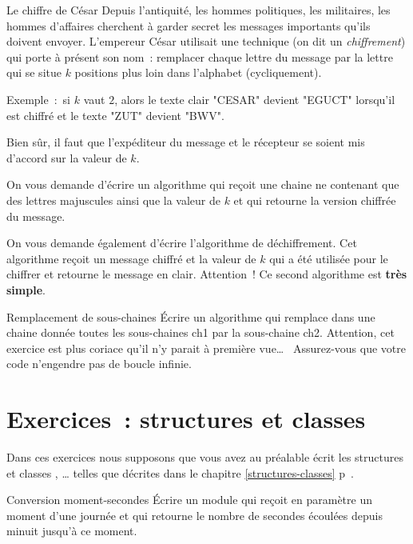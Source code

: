 \begin{Exercice}{Le chiffre de César}
	\label{ex:cesar}
	Depuis l’antiquité, les hommes politiques, les militaires, 
	les hommes d’affaires cherchent à garder secret les messages
	importants qu’ils doivent envoyer.
	L’empereur César utilisait une technique (on dit un \emph{chiffrement})
	qui porte à présent son nom~:
	remplacer chaque lettre du message par la lettre qui se situe 
	$k$ positions plus loin dans l’alphabet (cycliquement).

	Exemple~:~si $k$ vaut $2$, 
	alors le texte clair "CESAR" devient "EGUCT" lorsqu’il est chiffré 
	et le texte "ZUT" devient "BWV".

	Bien sûr, il faut que l’expéditeur du message et le récepteur
	se soient mis d’accord sur la valeur de $k$.

	On vous demande d’écrire un algorithme qui reçoit une chaine ne contenant
	que des lettres majuscules ainsi que la valeur de $k$ et qui retourne
	la version chiffrée du message.

	On vous demande également d’écrire l’algorithme de déchiffrement.
	Cet algorithme reçoit un message chiffré et la valeur de $k$ qui a été
	utilisée pour le chiffrer et retourne le message en clair.
	Attention~! Ce second algorithme est \textbf{très simple}.
\end{Exercice}

\begin{Exercice}{Remplacement de sous-chaines}
	Écrire un algorithme 
	qui remplace dans une chaine donnée 
	toutes les sous-chaines ch1 par la sous-chaine ch2. 
	Attention, 
	cet exercice est plus coriace qu’il n’y parait à première vue\dots~
	Assurez-vous que votre code n’engendre pas de boucle infinie. 
\end{Exercice}	










\section{Exercices~: structures et classes}

Dans ces exercices nous supposons que vous avez au préalable écrit les
structures et classes , … telles que décrites dans le
chapitre \ref{structures-classes} p~\pageref{structures-classes}.

\begin{Exercice}{Conversion moment-secondes}
	Écrire un module qui reçoit en paramètre un
	moment d’une journée et qui retourne le nombre de secondes écoulées
	depuis minuit jusqu’à ce moment.
\end{Exercice}

